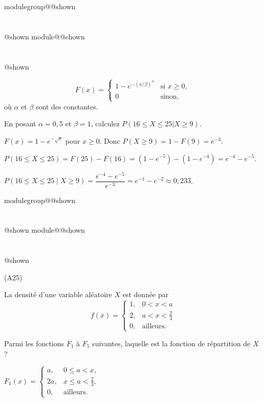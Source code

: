 \documentclass{Evaluation}
\makeatletter
\newcommand{\currentmodulekey}{}
\newcommand{\currentmoduletitle}{}
\newcommand{\currentgroupkey}{}
\newcommand{\currentgrouptitle}{}
\newcommand{\showmoduleifneeded}{%
  \ifx\currentgroupkey\empty\else
    \expandafter\ifx\csname modulegroup@\currentgroupkey @shown\endcsname\relax
      \section*{\currentgrouptitle}%
      \expandafter\gdef\csname modulegroup@\currentgroupkey @shown\endcsname{1}%
    \fi
  \fi
  \expandafter\ifx\csname module@\currentmodulekey @shown\endcsname\relax
    \section*{\currentmoduletitle}%
    \expandafter\gdef\csname module@\currentmodulekey @shown\endcsname{1}%
  \fi
}
\newenvironment{A24}{\showmoduleifneeded}{}
\newenvironment{A25}{\showmoduleifneeded}{}
\makeatother
\begin{document}
\begin{questions}
\begin{A24}
\[ F(x) =
\begin{cases}
   \displaystyle 1-e^{-(x/\beta)^\alpha}& \text{si } x \ge 0, \\
    0 & \text{sinon},
\end{cases}
\]
où $\alpha$ et $\beta$ sont des constantes.

En posant $\alpha = 0,5$ et $\beta=1$, calculez $P(16 \leq X \leq 25 | X\geq 9)$.

\begin{solution}
    $F(x)=1-e^{-\sqrt{x}}$ pour $x\geq 0$. Donc $P(X\geq 9)=1-F(9)=e^{-3}$.

    $P(16\leq X\leq 25)=F(25)-F(16)=(1-e^{-5})-(1-e^{-4})=e^{-4}-e^{-5}$.

    $P(16\leq X\leq 25\mid X\geq 9)=\dfrac{e^{-4}-e^{-5}}{e^{-3}}=e^{-1}-e^{-2}\approx 0,233$.
\end{solution}
\end{A24}

\begin{A25}
\question {}\label{2moyregle} (A25)

La densité d'une variable aléatoire $X$ est donnée par
$$f(x)=\left\{\begin{array}{ll}
1, & 0<x<a \\ 2, & a<x<\frac{2}{3} \\ 0, &  \text{ailleurs.}
\end{array}\right.$$

Parmi les fonctions $F_1$ à $F_5$ suivantes, laquelle est la fonction de répartition
   de $X$ ?

 \begin{checkboxes}


     \choice $F_1(x)=\left\{\begin{array}{ll}
     a, & 0\le a<x, \\
     2a, & x\le a < \frac{2}{3}, \\
     0, & \text{ailleurs}.
     \end{array}\right.$



\end{checkboxes}
\end{A25}
\end{questions}
\end{document}
